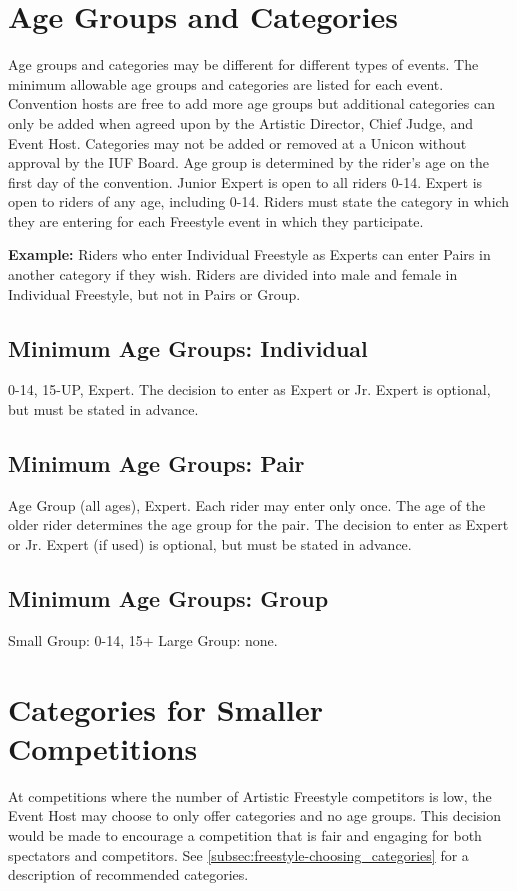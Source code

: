 \section{Age Groups and Categories}
Age groups and categories may be different for different types of events.
The minimum allowable age groups and categories are listed for each event.
Convention hosts are free to add more age groups but additional categories can only be added when agreed upon by the Artistic Director, Chief Judge, and Event Host.
Categories may not be added or removed at a Unicon without approval by the IUF Board.
Age group is determined by the rider's age on the first day of the convention.
Junior Expert is open to all riders 0-14.
Expert is open to riders of any age, including 0-14.
Riders must state the category in which they are entering for each Freestyle event in which they participate.

\textbf{Example:} Riders who enter Individual Freestyle as Experts can enter Pairs in another category if they wish.
Riders are divided into male and female in Individual Freestyle, but not in Pairs or Group.

\subsection{Minimum Age Groups: Individual}
 0-14, 15-UP, Expert.
The decision to enter as Expert or Jr. Expert is optional, but must be stated in advance.

\subsection{Minimum Age Groups: Pair}

Age Group (all ages), Expert.
Each rider may enter only once.
The age of the older rider determines the age group for the pair.
The decision to enter as Expert or Jr. Expert (if used) is optional, but must be stated in advance.

\subsection{Minimum Age Groups: Group}

Small Group: 0-14, 15+
Large Group: none.

\section{Categories for Smaller Competitions}
At competitions where the number of Artistic Freestyle competitors is low, the Event Host may choose to only offer categories and no age groups.
This decision would be made to encourage a competition that is fair and engaging for both spectators and competitors.
See \ref{subsec:freestyle-choosing_categories} for a description of recommended categories.

